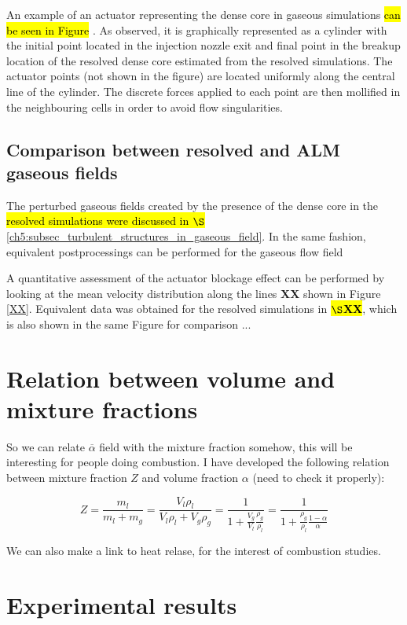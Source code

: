 An example of an actuator representing the dense core in gaseous simulations \hl{can be seen in Figure }. As observed, it is graphically represented as a cylinder with the initial point located in the injection nozzle exit and final point in the breakup location of the resolved dense core estimated from the resolved simulations. The actuator points (not shown in the figure) are located uniformly along the central line of the cylinder. The discrete forces applied to each point are then mollified in the neighbouring cells in order to avoid flow singularities.

\subsection{Comparison between resolved and ALM gaseous fields}

The perturbed gaseous fields created by the presence of the dense core in the \hl{resolved simulations were discussed in $\S$}\ref{ch5:subsec_turbulent_structures_in_gaseous_field}. In the same fashion, equivalent postprocessings can be performed for the gaseous flow field 

A quantitative assessment of the actuator blockage effect can be performed by looking at the mean velocity distribution along the lines \textbf{XX} shown in Figure \ref{XX}. Equivalent data was obtained for the resolved simulations in \hl{\textbf{$\S$XX}}, which is also shown in the same Figure for comparison ...

\section{Relation between volume and mixture fractions}

So we can relate $\overline{\alpha}$ field with the mixture fraction somehow, this will be interesting for people doing combustion. I have developed the following relation between mixture fraction $Z$ and volume fraction $\alpha$ (need to check it properly):

\begin{equation}
Z = \frac{m_l}{m_l + m_g} = \frac{V_l \rho_l}{V_l \rho_l + V_g \rho_g} = \frac{1}{1 + \frac{V_g}{V_l} \frac{\rho_g}{\rho_l}} = \frac{1}{1 + \frac{\rho_g}{\rho_l} \frac{1 - \alpha}{\alpha}}
\end{equation}


We can also make a link to heat relase, for the interest of combustion studies.

\section{Experimental results}

